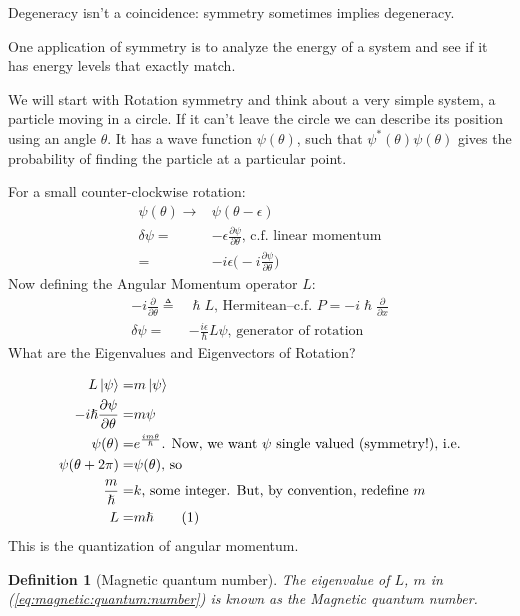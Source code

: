 \documentclass[]{article}
\newcommand\numberthis{\addtocounter{equation}{1}\tag{\theequation}}
\newtheorem{defn}[thm]{Definition}
\begin{document}
Degeneracy isn't a coincidence: symmetry sometimes implies degeneracy.

One application of symmetry is to analyze the energy of a system and see if it has energy levels that exactly match.


We will start with Rotation symmetry and think about a very simple system, a particle moving in a circle. If it can't leave the circle we can describe its position using an angle $\theta$. It has a wave function $\psi(\theta)$, such that $\psi^*(\theta)\psi(\theta)$ gives the probability of finding the particle at a particular point.

For a small counter-clockwise rotation:
\begin{align*}
\psi(\theta) \rightarrow & \psi(\theta - \epsilon)\\
\delta\psi =& - \epsilon \frac{\partial \psi}{\partial \theta} \text{, c.f. linear momentum}\\
=& -i \epsilon \big(-i \frac{\partial \psi}{\partial \theta}\big)
\end{align*}
Now defining the Angular Momentum operator $L$:
\begin{align}
- i \frac{\partial}{\partial \theta} \triangleq&\hslash L \text{, Hermitean--c.f. $P=-i\hslash \frac{\partial}{\partial x}$}\\
\delta\psi =& - \frac{i \epsilon}{\hslash} L \psi \text{, generator of rotation}
\end{align}
What are the Eigenvalues and Eigenvectors of Rotation?

\begin{align*}
L\ket{\psi} =& m \ket{\psi}\\
-i \hslash \frac{\partial \psi}{\partial \theta} =& m \psi\\
\psi(\theta) =& e^{\frac{i m \theta}{\hslash}}\text{. Now, we want $\psi$ single valued (symmetry!), i.e.}\\
\psi(\theta + 2\pi) =& \psi(\theta) \text{, so}\\
\frac{m}{\hslash}=&k\text{, some integer. But, by convention, redefine $m$}\\
L=& m \hslash \numberthis \label{eq:magnetic:quantum:number}
\end{align*}
This is the quantization of angular momentum.

\begin{defn}[Magnetic quantum number]
	The eigenvalue of $L$, $m$ in (\ref{eq:magnetic:quantum:number}) is known as the Magnetic quantum number.
\end{defn}
\end{document}
